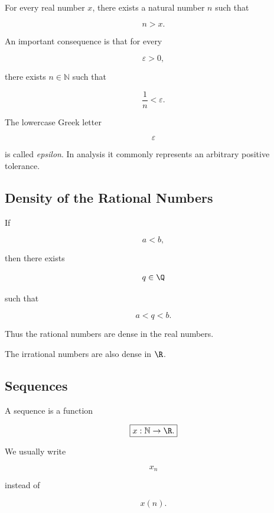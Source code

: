 \begin{theorem}
For every real number \(x\), there exists a natural number \(n\) such that

\[
\boxed{
n>x.
}
\]
\end{theorem}

An important consequence is that for every

\[
\varepsilon>0,
\]

there exists \(n\in\mathbb{N}\) such that

\[
\boxed{
\frac1n<\varepsilon.
}
\]

The lowercase Greek letter

\[
\varepsilon
\]

is called \emph{epsilon}. In analysis it commonly represents an arbitrary
positive tolerance.

\subsection{Density of the Rational Numbers}
\label{subsec:density-rationals}

\begin{theorem}
If

\[
a<b,
\]

then there exists

\[
q\in\Q
\]

such that

\[
\boxed{
a<q<b.
}
\]
\end{theorem}

Thus the rational numbers are dense in the real numbers.

The irrational numbers are also dense in \(\R\).

\subsection{Sequences}
\label{subsec:sequences-real-analysis}

A sequence is a function

\[
\boxed{
x:\mathbb{N}\to\R.
}
\]

We usually write

\[
x_n
\]

instead of

\[
x(n).
\]

